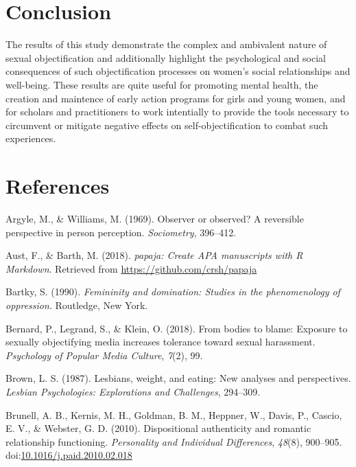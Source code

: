 \documentclass[man]{apa6}
\begin{document}
\section{Conclusion}\label{conclusion}

The results of this study demonstrate the complex and ambivalent nature
of sexual objectification and additionally highlight the psychological
and social consequences of such objectification processes on women's
social relationships and well-being. These results are quite useful for
promoting mental health, the creation and maintence of early action
programs for girls and young women, and for scholars and practitioners
to work intentially to provide the tools necessary to circumvent or
mitigate negative effects on self-objectification to combat such
experiences.

\section{References}\label{references}

\newpage

\begingroup
\setlength{\parindent}{-0.5in} \setlength{\leftskip}{0.5in}

\hypertarget{refs}{}
\hypertarget{ref-argyle1969}{}
Argyle, M., \& Williams, M. (1969). Observer or observed? A reversible
perspective in person perception. \emph{Sociometry}, 396--412.

\hypertarget{ref-R-papaja}{}
Aust, F., \& Barth, M. (2018). \emph{papaja: Create APA manuscripts with
R Markdown}. Retrieved from \url{https://github.com/crsh/papaja}

\hypertarget{ref-Bartky}{}
Bartky, S. (1990). \emph{Femininity and domination: Studies in the
phenomenology of oppression}. Routledge, New York.

\hypertarget{ref-bernard2018bodies}{}
Bernard, P., Legrand, S., \& Klein, O. (2018). From bodies to blame:
Exposure to sexually objectifying media increases tolerance toward
sexual harassment. \emph{Psychology of Popular Media Culture},
\emph{7}(2), 99.

\hypertarget{ref-brown1987lesbians}{}
Brown, L. S. (1987). Lesbians, weight, and eating: New analyses and
perspectives. \emph{Lesbian Psychologies: Explorations and Challenges},
294--309.

\hypertarget{ref-brunelletal2010}{}
Brunell, A. B., Kernis, M. H., Goldman, B. M., Heppner, W., Davis, P.,
Cascio, E. V., \& Webster, G. D. (2010). Dispositional authenticity and
romantic relationship functioning. \emph{Personality and Individual
Differences}, \emph{48}(8), 900--905.
doi:\href{https://doi.org/10.1016/j.paid.2010.02.018}{10.1016/j.paid.2010.02.018}
\end{document}
